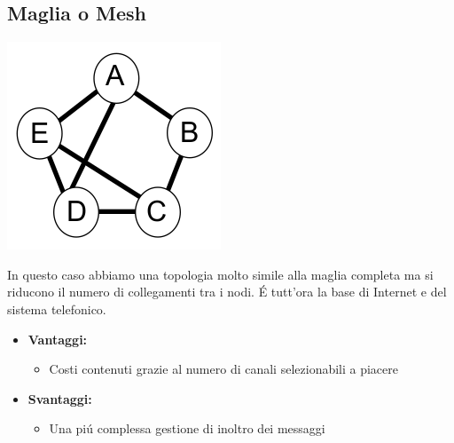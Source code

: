 \documentclass[12pt]{article}
\begin{document}
\subsection{Maglia o Mesh}\label{mesh}
\begin{center}
	\includegraphics[scale=0.5]{introduzione-img7.png}
\end{center}
In questo caso abbiamo una topologia molto simile alla maglia completa ma si riducono il numero di collegamenti tra i nodi.
\'E tutt'ora la base di Internet e del sistema telefonico.
\begin{itemize}[noitemsep]
	\item \textbf{Vantaggi:}
	\begin{itemize}[noitemsep]
		\item Costi contenuti grazie al numero di canali selezionabili a piacere
	\end{itemize}
	\item \textbf{Svantaggi:}
	\begin{itemize}[noitemsep]
		\item Una pi\'u complessa gestione di inoltro dei messaggi
	\end{itemize}
\end{itemize}
\end{document}
